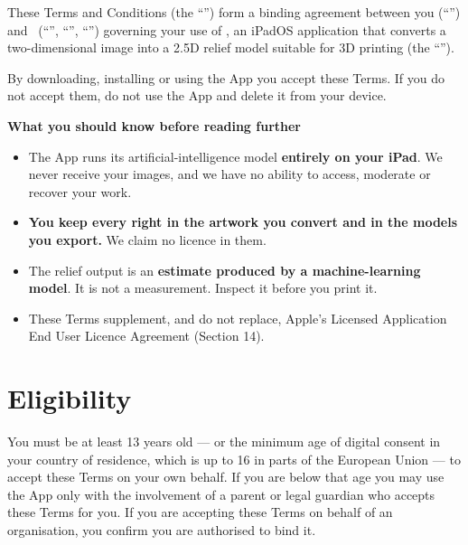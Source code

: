 \documentclass[11pt]{article}
\newcommand{\publisher}{\ph{DEVELOPER LEGAL NAME}}
\begin{document}
\legaltitle

These Terms and Conditions (the “”) form a binding agreement between you
(“”) and \publisher\ (“”, “”, “”)
governing your use of , an iPadOS application that converts a
two-dimensional image into a 2.5D relief model suitable for 3D printing (the
“”).

By downloading, installing or using the App you accept these Terms. If you do not
accept them, do not use the App and delete it from your device.

\begin{keybox}
{\headingfont\bfseries\fontsize{12}{14}\selectfont What you should know before reading further}\par
\vspace{1.5mm}
\begin{itemize}[topsep=2pt]
  \item The App runs its artificial-intelligence model \textbf{entirely on your iPad}.
        We never receive your images, and we have no ability to access, moderate or
        recover your work.
  \item \textbf{You keep every right in the artwork you convert and in the models you
        export.} We claim no licence in them.
  \item The relief output is an \textbf{estimate produced by a machine-learning model}.
        It is not a measurement. Inspect it before you print it.
  \item These Terms supplement, and do not replace, Apple's Licensed Application End
        User Licence Agreement (Section 14).
\end{itemize}
\end{keybox}

\section{Eligibility}

You must be at least 13 years old — or the minimum age of digital consent in your
country of residence, which is up to 16 in parts of the European Union — to accept
these Terms on your own behalf. If you are below that age you may use the App only with
the involvement of a parent or legal guardian who accepts these Terms for you. If you
are accepting these Terms on behalf of an organisation, you confirm you are authorised
to bind it.
\end{document}
